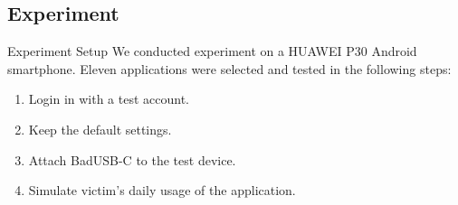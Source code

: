 \documentclass{beamer}
\begin{document}
\subsection{Experiment}
\begin{frame}{Experiment Setup}
	We conducted experiment on a HUAWEI P30 Android smartphone. Eleven applications were selected and tested in the following steps:
	\begin{enumerate}
		\item Login in with a test account.
		\item Keep the default settings.
		\item Attach BadUSB-C to the test device.
		\item Simulate victim's daily usage of the application.
	\end{enumerate}
\end{frame}
\end{document}
